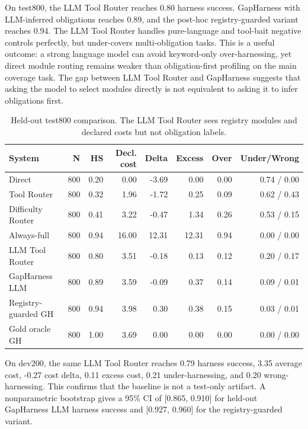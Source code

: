 \documentclass[
  10pt,
]{article}
\begin{document}
On test800, the LLM Tool Router reaches 0.80 harness success. GapHarness
with LLM-inferred obligations reaches 0.89, and the post-hoc
registry-guarded variant reaches 0.94. The LLM Tool Router handles
pure-language and tool-bait negative controls perfectly, but
under-covers multi-obligation tasks. This is a useful outcome: a strong
language model can avoid keyword-only over-harnessing, yet direct module
routing remains weaker than obligation-first profiling on the main
coverage task. The gap between LLM Tool Router and GapHarness suggests
that asking the model to select modules directly is not equivalent to
asking it to infer obligations first.

\begin{table}[H]
\centering
\scriptsize
\caption{Held-out test800 comparison. The LLM Tool Router sees registry modules and declared costs but not obligation labels.}
\label{tab:test800}
\begin{tabular}{lrrrrrrr}
\toprule
System & N & HS & Decl. cost & Delta & Excess & Over & Under/Wrong\\
\midrule
Direct & 800 & 0.20 & 0.00 & -3.69 & 0.00 & 0.00 & 0.74 / 0.00\\
Tool Router & 800 & 0.32 & 1.96 & -1.72 & 0.25 & 0.09 & 0.62 / 0.43\\
Difficulty Router & 800 & 0.41 & 3.22 & -0.47 & 1.34 & 0.26 & 0.53 / 0.15\\
Always-full & 800 & 0.94 & 16.00 & 12.31 & 12.31 & 0.94 & 0.00 / 0.00\\
LLM Tool Router & 800 & 0.80 & 3.51 & -0.18 & 0.13 & 0.12 & 0.20 / 0.17\\
GapHarness LLM & 800 & 0.89 & 3.59 & -0.09 & 0.37 & 0.14 & 0.09 / 0.01\\
Registry-guarded GH & 800 & 0.94 & 3.98 & 0.30 & 0.38 & 0.15 & 0.03 / 0.01\\
Gold oracle GH & 800 & 1.00 & 3.69 & 0.00 & 0.00 & 0.00 & 0.00 / 0.00\\
\bottomrule
\end{tabular}
\end{table}

On dev200, the same LLM Tool Router reaches 0.79 harness success, 3.35
average cost, -0.27 cost delta, 0.11 excess cost, 0.21 under-harnessing,
and 0.20 wrong-harnessing. This confirms that the baseline is not a
test-only artifact. A nonparametric bootstrap gives a 95\% CI of
{[}0.865, 0.910{]} for held-out GapHarness LLM harness success and
{[}0.927, 0.960{]} for the registry-guarded variant.
\end{document}
